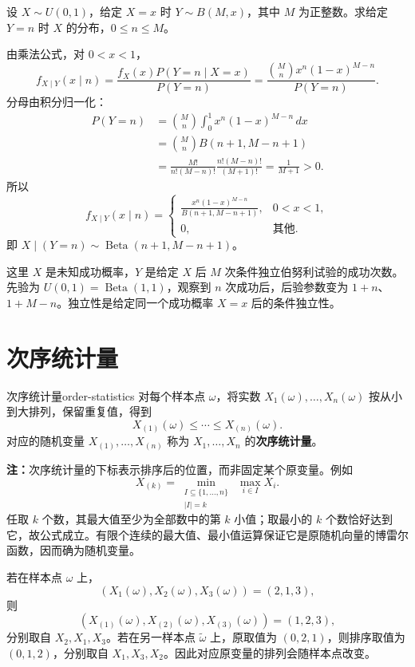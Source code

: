 \begin{example}[均匀先验与二项抽样]
设 $X\sim U(0,1)$，给定 $X=x$ 时 $Y\sim B(M,x)$，其中 $M$ 为正整数。求给定 $Y=n$ 时 $X$ 的分布，$0\leq n\leq M$。

由乘法公式，对 $0<x<1$，
\[
f_{X\mid Y}(x\mid n)
=\frac{f_X(x)P(Y=n\mid X=x)}{P(Y=n)}
=\frac{\binom Mn x^n(1-x)^{M-n}}{P(Y=n)}.
\]
分母由积分归一化：
\begin{align*}
P(Y=n)
&=\binom Mn\int_0^1x^n(1-x)^{M-n}\,dx\\
&=\binom Mn B(n+1,M-n+1)\\
&=\frac{M!}{n!(M-n)!}\frac{n!(M-n)!}{(M+1)!}
=\frac1{M+1}>0.
\end{align*}
所以
\[
f_{X\mid Y}(x\mid n)=
\begin{cases}
\displaystyle\frac{x^n(1-x)^{M-n}}{B(n+1,M-n+1)},&0<x<1,\\
0,&\text{其他}.
\end{cases}
\]
即 $X\mid(Y=n)\sim\operatorname{Beta}(n+1,M-n+1)$。

这里 $X$ 是未知成功概率，$Y$ 是给定 $X$ 后 $M$ 次条件独立伯努利试验的成功次数。先验为 $U(0,1)=\operatorname{Beta}(1,1)$，观察到 $n$ 次成功后，后验参数变为 $1+n$、$1+M-n$。独立性是给定同一个成功概率 $X=x$ 后的条件独立性。
\end{example}

\section{次序统计量}
\label{sec:order-statistics}

\begin{mydefinition}{次序统计量}{order-statistics}
对每个样本点 $\omega$，将实数 $X_1(\omega),\ldots,X_n(\omega)$ 按从小到大排列，保留重复值，得到
\[
X_{(1)}(\omega)\leq\cdots\leq X_{(n)}(\omega).
\]
对应的随机变量 $X_{(1)},\ldots,X_{(n)}$ 称为 $X_1,\ldots,X_n$ 的\textbf{次序统计量}。
\end{mydefinition}

\textbf{注：}\quad 次序统计量的下标表示排序后的位置，而非固定某个原变量。例如
\[
X_{(k)}=\min_{\substack{I\subseteq\{1,\ldots,n\}\\|I|=k}}\ \max_{i\in I}X_i.
\]
任取 $k$ 个数，其最大值至少为全部数中的第 $k$ 小值；取最小的 $k$ 个数恰好达到它，故公式成立。有限个连续的最大值、最小值运算保证它是原随机向量的博雷尔函数，因而确为随机变量。

\begin{example}[三个变量的排序]
若在样本点 $\omega$ 上，
\[
(X_1(\omega),X_2(\omega),X_3(\omega))=(2,1,3),
\]
则
\[
(X_{(1)}(\omega),X_{(2)}(\omega),X_{(3)}(\omega))=(1,2,3),
\]
分别取自 $X_2,X_1,X_3$。若在另一样本点 $\widetilde\omega$ 上，原取值为 $(0,2,1)$，则排序取值为 $(0,1,2)$，分别取自 $X_1,X_3,X_2$。因此对应原变量的排列会随样本点改变。
\end{example}

